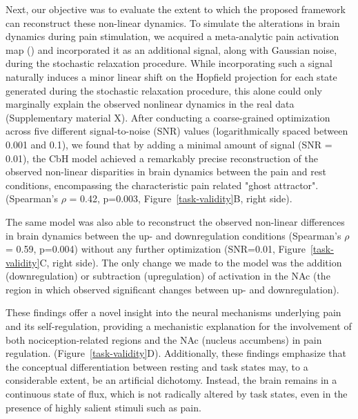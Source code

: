 \documentclass{article}
\begin{document}
Next, our objective was to evaluate the extent to which the proposed framework can reconstruct these non-linear dynamics.
To simulate the alterations in brain dynamics during pain stimulation, we acquired a meta-analytic pain activation map (\href{https://doi.org/10.1038/s41467-021-21179-3}{}) and incorporated it as an additional signal, along with Gaussian noise, during the stochastic relaxation procedure.
While incorporating such a signal naturally induces a minor linear shift on the Hopfield projection for each state generated during the stochastic relaxation procedure, this alone could only marginally explain the observed nonlinear dynamics in the real data (Supplementary material X).
After conducting a coarse-grained optimization across five different signal-to-noise (SNR) values (logarithmically spaced between 0.001 and 0.1), we found that by adding a minimal amount of signal (SNR = 0.01), the CbH model achieved a remarkably precise reconstruction of the observed non-linear disparities in brain dynamics between the pain and rest conditions, encompassing the characteristic pain related "ghost attractor". (Spearman's $\rho$ = 0.42, p=0.003, Figure~\ref{task-validity}B, right side).

The same model was also able to reconstruct the observed non-linear differences in brain dynamics between the up- and downregulation conditions (Spearman's $\rho$ = 0.59, p=0.004) without any further optimization (SNR=0.01, Figure~\ref{task-validity}C, right side).
The only change we made to the model was the addition (downregulation) or subtraction (upregulation) of activation in the NAc (the region in which \href{https://doi.org/10.1371/journal.pbio.1002036}{} observed significant changes between up- and downregulation).

These findings offer a novel insight into the neural mechanisms underlying pain and its self-regulation, providing a mechanistic explanation for the involvement of both nociception-related regions and the NAc (nucleus accumbens) in pain regulation. (Figure~\ref{task-validity}D).
Additionally, these findings emphasize that the conceptual differentiation between resting and task states may, to a considerable extent, be an artificial dichotomy. Instead, the brain remains in a continuous state of flux, which is not radically altered by task states, even in the presence of highly salient stimuli such as pain.

\end{document}
